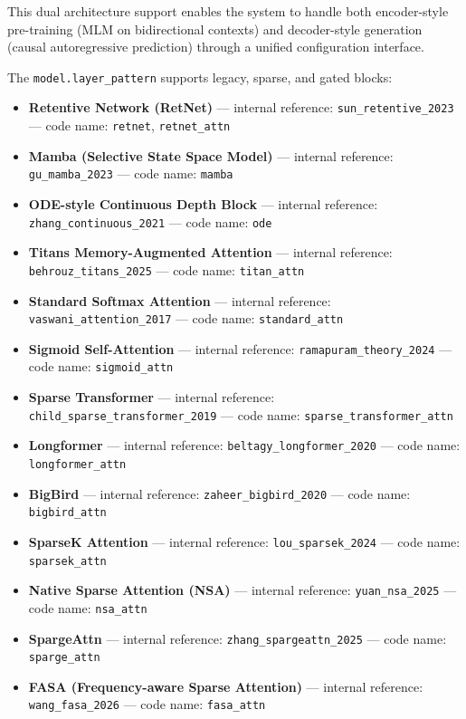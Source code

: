 \documentclass[11pt,a4paper]{article}
\begin{document}
This dual architecture support enables the system to handle both encoder-style pre-training (MLM on bidirectional contexts) and decoder-style generation (causal autoregressive prediction) through a unified configuration interface.

The \texttt{model.layer\_pattern} supports legacy, sparse, and gated blocks:
\begin{itemize}[leftmargin=*]
    \item \textbf{Retentive Network (RetNet)} --- internal reference: \texttt{sun\_retentive\_2023} --- code name: \texttt{retnet}, \texttt{retnet\_attn}
    \item \textbf{Mamba (Selective State Space Model)} --- internal reference: \texttt{gu\_mamba\_2023} --- code name: \texttt{mamba}
    \item \textbf{ODE-style Continuous Depth Block} --- internal reference: \texttt{zhang\_continuous\_2021} --- code name: \texttt{ode}
    \item \textbf{Titans Memory-Augmented Attention} --- internal reference: \texttt{behrouz\_titans\_2025} --- code name: \texttt{titan\_attn}
    \item \textbf{Standard Softmax Attention} --- internal reference: \texttt{vaswani\_attention\_2017} --- code name: \texttt{standard\_attn}
    \item \textbf{Sigmoid Self-Attention} --- internal reference: \texttt{ramapuram\_theory\_2024} --- code name: \texttt{sigmoid\_attn}
    \item \textbf{Sparse Transformer} --- internal reference: \texttt{child\_sparse\_transformer\_2019} --- code name: \texttt{sparse\_transformer\_attn}
    \item \textbf{Longformer} --- internal reference: \texttt{beltagy\_longformer\_2020} --- code name: \texttt{longformer\_attn}
    \item \textbf{BigBird} --- internal reference: \texttt{zaheer\_bigbird\_2020} --- code name: \texttt{bigbird\_attn}
    \item \textbf{SparseK Attention} --- internal reference: \texttt{lou\_sparsek\_2024} --- code name: \texttt{sparsek\_attn}
    \item \textbf{Native Sparse Attention (NSA)} --- internal reference: \texttt{yuan\_nsa\_2025} --- code name: \texttt{nsa\_attn}
    \item \textbf{SpargeAttn} --- internal reference: \texttt{zhang\_spargeattn\_2025} --- code name: \texttt{sparge\_attn}
    \item \textbf{FASA (Frequency-aware Sparse Attention)} --- internal reference: \texttt{wang\_fasa\_2026} --- code name: \texttt{fasa\_attn}

\end{itemize}
\end{document}
